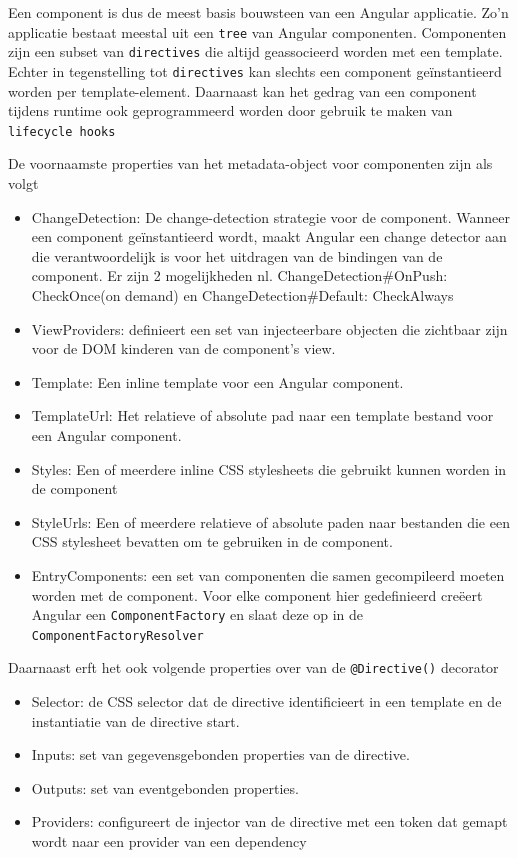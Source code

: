 Een component is dus de meest basis bouwsteen van een Angular applicatie. Zo'n applicatie bestaat meestal uit een \texttt{tree} van Angular componenten. Componenten zijn een subset van \texttt{directives} die altijd geassocieerd worden met een template. Echter in tegenstelling tot \texttt{directives} kan slechts een component geïnstantieerd worden per template-element. Daarnaast kan het gedrag van een component tijdens runtime ook geprogrammeerd worden door gebruik te maken van \texttt{lifecycle hooks} \autocite{Angular2019c}

De voornaamste properties van het metadata-object voor componenten zijn als volgt \autocite{Angular2019c}
\begin{itemize}
    \item ChangeDetection: De change-detection strategie voor de component. Wanneer een component geïnstantieerd wordt, maakt Angular een change detector aan die verantwoordelijk is voor het uitdragen van de bindingen van de component. Er zijn 2 mogelijkheden nl. ChangeDetection\#OnPush: CheckOnce(on demand) en ChangeDetection\#Default: CheckAlways
    \item ViewProviders: definieert een set van injecteerbare objecten die zichtbaar zijn voor de DOM kinderen van de component's view.
    \item Template: Een inline template voor een Angular component.
    \item TemplateUrl: Het relatieve of absolute pad naar een template bestand voor een Angular component. %
    \item Styles: Een of meerdere inline CSS stylesheets die gebruikt kunnen worden in de component
    \item StyleUrls: Een of meerdere relatieve of absolute paden naar bestanden die een CSS stylesheet bevatten om te gebruiken in de component. %
    \item EntryComponents: een set van componenten die samen gecompileerd moeten worden met de component. Voor elke component hier gedefinieerd creëert Angular een \texttt{ComponentFactory} en slaat deze op in de \texttt{ComponentFactoryResolver}
\end{itemize}
Daarnaast erft het ook volgende properties over van de \texttt{@Directive()} decorator \autocite{Angular2019c}
\begin{itemize}
    \item Selector: de CSS selector dat de directive identificieert in een template en de instantiatie van de directive start.
    \item Inputs: set van gegevensgebonden properties van de directive.
    \item Outputs: set van eventgebonden properties.
    \item Providers: configureert de injector van de directive met een token dat gemapt wordt naar een provider van een dependency %
\end{itemize} 

